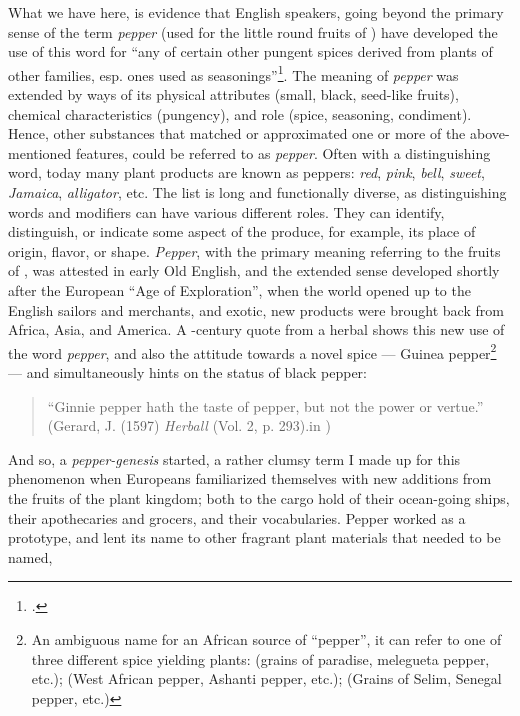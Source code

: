 What we have here, is evidence that English speakers, going beyond the primary sense of the term \textit{pepper} (used for the little round fruits of ) have developed the use of this word for ``any of certain other pungent spices derived from plants of other families, esp. ones used as seasonings''\footcite[pepper, n.]{oed}. The meaning of \textit{pepper} was extended by ways of its physical attributes (small, black, seed-like fruits), chemical characteristics (pungency), and role (spice, seasoning, condiment). Hence, other substances that matched or approximated one or more of the above-mentioned features, could be referred to as \textit{pepper}. Often with a distinguishing word, today many plant products are known as peppers: \textit{red}, \textit{pink},  \textit{bell}, \textit{sweet},
\textit{Jamaica}, \textit{alligator}, etc. The list is long and functionally diverse, as distinguishing words and modifiers can have various different roles. They can identify, distinguish, or indicate some aspect of the produce, for example, its place of origin, flavor, or shape. \textit{Pepper}, with the primary meaning referring to the fruits of , was attested in early Old English, and the extended sense developed shortly after the European ``Age of Exploration'', when the world opened up to the English sailors and merchants, and exotic, new products were brought back from Africa, Asia, and America. A -century quote from a herbal shows this new use of the word \textit{pepper}, and also the attitude towards a novel spice --- Guinea pepper\footnote{An ambiguous name for an African source of ``pepper'', it can refer to one of three different spice yielding plants:  (grains of paradise, melegueta pepper, etc.);  (West African pepper, Ashanti pepper, etc.);  (Grains of Selim, Senegal pepper, etc.)} --- and simultaneously hints on the status of black pepper: 

\begin{quote}
``Ginnie pepper hath the taste of pepper, but not the power or vertue.'' \\
(Gerard, J. (1597) \textit{Herball} (Vol. 2, p. 293).in \cite[pepper]{oed})
\end{quote}

And so, a \textit{pepper-genesis} started, a rather clumsy term I made up for this phenomenon when Europeans familiarized themselves with new additions from the fruits of the plant kingdom; both to the cargo hold of their ocean-going ships, their apothecaries and grocers, and their vocabularies. Pepper worked as a prototype, and lent its name to other fragrant plant materials that needed to be named, 

